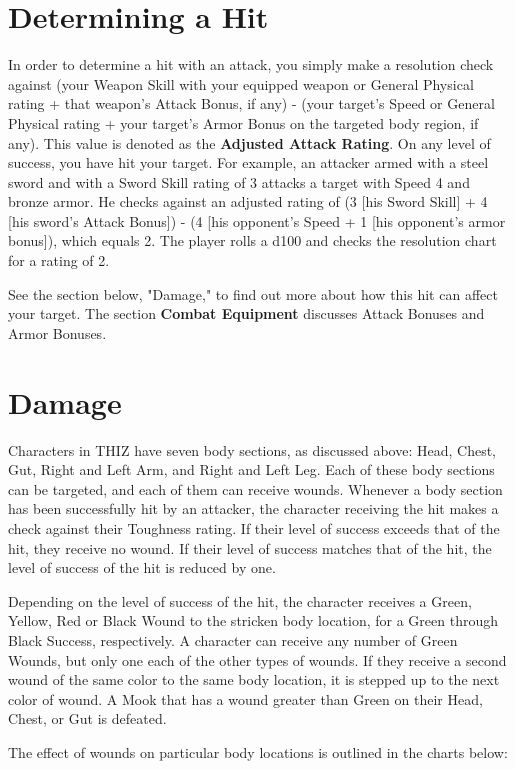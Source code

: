 \documentclass[oneside]{book}
\begin{document}
\begin{multicols}{2}
\section{Determining a Hit}
In order to determine a hit with an attack, you simply make a resolution check against (your Weapon Skill with your equipped weapon or General Physical rating + that weapon's Attack Bonus, if any) - (your target's Speed or General Physical rating + your target's Armor Bonus on the targeted body region, if any). This value is denoted as the \textbf{Adjusted Attack Rating}. On any level of success, you have hit your target. For example, an attacker armed with a steel sword and with a Sword Skill rating of 3 attacks a target with Speed 4 and bronze armor. He checks against an adjusted rating of (3 [his Sword Skill] + 4 [his sword's Attack Bonus]) - (4 [his opponent's Speed + 1 [his opponent's armor bonus]), which equals 2. The player rolls a d100 and checks the resolution chart for a rating of 2.

See the section below, "Damage," to find out more about how this hit can affect your target. The section \textbf{Combat Equipment} discusses Attack Bonuses and Armor Bonuses. 

\section{Damage}
Characters in THIZ have seven body sections, as discussed above: Head, Chest, Gut, Right and Left Arm, and Right and Left Leg. Each of these body sections can be targeted, and each of them can receive wounds. Whenever a body section has been successfully hit by an attacker, the character receiving the hit makes a check against their Toughness rating. If their level of success exceeds that of the hit, they receive no wound. If their level of success matches that of the hit, the level of success of the hit is reduced by one. 

Depending on the level of success of the hit, the character receives a Green, Yellow, Red or Black Wound to the stricken body location, for a Green through Black Success, respectively. A character can receive any number of Green Wounds, but only one each of the other types of wounds. If they receive a second wound of the same color to the same body location, it is stepped up to the next color of wound. A Mook that has a wound greater than Green on their Head, Chest, or Gut is defeated.

The effect of wounds on particular body locations is outlined in the charts below:


\end{multicols}
\end{document}
